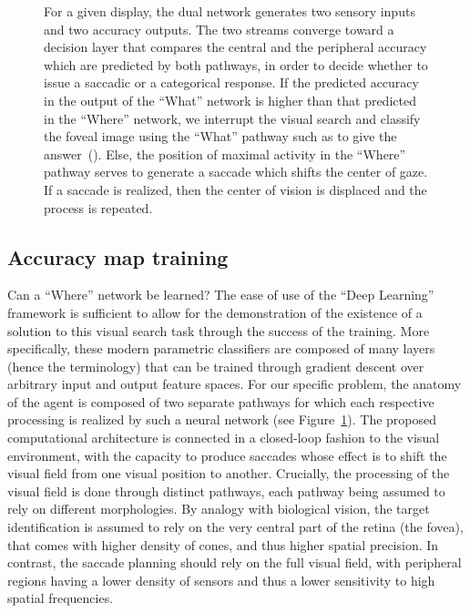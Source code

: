 \begin{figure}[t!]
{		\D
		For a given display, the dual network generates two sensory inputs and two accuracy outputs. The two streams converge toward a decision layer that compares the central and the peripheral accuracy which are predicted by both pathways, in order to decide whether to issue a saccadic or a categorical response. If the predicted accuracy in the output of the ``What'' network is higher than that predicted in the ``Where'' network,  we interrupt the visual search and classify the foveal image using the ``What'' pathway such as to give the answer~(\ANS ).  Else, the position of maximal activity in the ``Where'' pathway serves to generate a saccade which shifts the center of gaze. If a saccade is realized, then the center of vision is displaced and the process is repeated.%
		\label{fig:methods}}%
\end{figure}%
%
\subsection{Accuracy map training}
%
Can a ``Where'' network be learned? The ease of use of the ``Deep Learning'' framework is sufficient to allow for the demonstration of the existence of a solution to this visual search task through the success of the training. More specifically, these modern parametric classifiers are composed of many layers (hence the terminology) that can be trained through gradient descent over arbitrary input and output feature spaces. For our specific problem, the anatomy of the agent is composed of two separate pathways for which each respective processing is realized by such a neural network (see Figure~\ref{fig:methods}). The proposed computational architecture is connected in a closed-loop fashion to the visual environment, with the capacity to produce saccades whose effect is to shift the visual field from one visual position to another. Crucially, the processing of the visual field is done through distinct pathways, each pathway being assumed to rely on different morphologies. By analogy with biological vision, the target identification is assumed to rely on the very central part of the retina (the fovea), that comes with higher density of cones, and thus higher spatial precision. In contrast, the saccade planning should rely on the full visual field, with peripheral regions having a lower density of sensors and thus a lower sensitivity to high spatial frequencies.

